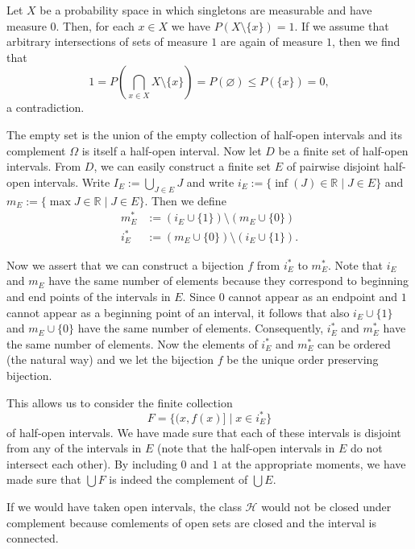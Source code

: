\documentclass{article}
\begin{document}
\begin{ex}
Let $X$ be a probability space in which singletons are measurable and have measure $0$. Then, for each $x\in X$ we have $P(X\setminus\{x\})=1$. If we assume that arbitrary intersections of sets of measure $1$ are again of measure $1$, then we find that
\begin{equation*}\textstyle
1=P(\bigcap_{x\in X}X\setminus\{x\})=P(\varnothing)\leq P(\{x\})=0,
\end{equation*}
a contradiction.
\end{ex}

\begin{ex}
The empty set is the union of the empty collection of half-open intervals and its complement $\Omega$ is itself a half-open interval. Now let $D$ be a finite set of half-open intervals. From $D$, we
can easily construct a finite set $E$ of pairwise disjoint half-open intervals. 
Write $I_E:=\bigcup_{J\in E} J$ and write $i_E:=\{\inf(J)\in\mathbb{R}\mid J\in E\}$ and $m_E:=\{\max J\in\mathbb{R}\mid J\in E\}$. Then we define 
\begin{align*}
m_E^\ast & :=(i_E\cup\{1\})\setminus (m_E\cup\{0\})\\
i_E^\ast & :=(m_E\cup\{0\})\setminus (i_E\cup\{1\}).
\end{align*} 

Now we assert that we can construct a bijection $f$ from $i_E^\ast$ to $m_E^\ast$. Note that $i_E$ and $m_E$ have the same number of elements because they correspond to beginning and end points of the intervals in $E$. Since $0$ cannot appear as an endpoint and $1$ cannot appear as a beginning point of an interval, it follows that also $i_E\cup\{1\}$ and $m_E\cup\{0\}$ have the same number of elements. Consequently, $i_E^\ast$ and $m_E^\ast$ have the same number of elements. Now the elements of $i_E^\ast$ and $m_E^\ast$ can be ordered (the natural way) and we let the bijection $f$ be the unique order preserving bijection.

This allows us to consider the finite collection
\begin{equation*}
F=\{(x,f(x)]\mid x\in i_E^\ast\}
\end{equation*}
of half-open intervals. We have made sure that each of these intervals is disjoint from any of the intervals in $E$ (note that the half-open intervals in $E$ do not intersect each other). By including $0$ and $1$ at the appropriate moments, we have made sure that $\bigcup F$ is indeed the complement of $\bigcup E$.

If we would have taken open intervals, the class $\mathcal{H}$ would not be closed under complement because comlements of open sets are closed and the interval is connected.
\end{ex}
\end{document}
